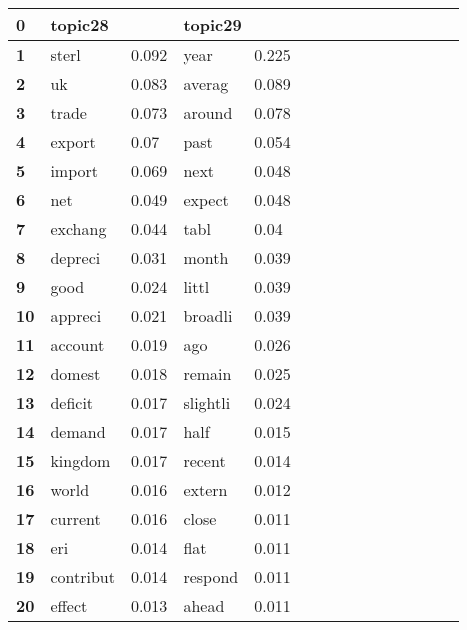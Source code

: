 \begin{tabular}{|l|l|l||l|l||l|l||l|l||l|l||l|l||l|l||}
\toprule
\textbf{0} & \multicolumn{2}{l}{topic28} & \multicolumn{2}{l}{topic29} \\
\midrule
\textbf{1 } &  sterl &  0.092 &  year &  0.225 \\
\textbf{2 } &  uk &  0.083 &  averag &  0.089 \\
\textbf{3 } &  trade &  0.073 &  around &  0.078 \\
\textbf{4 } &  export &  0.07 &  past &  0.054 \\
\textbf{5 } &  import &  0.069 &  next &  0.048 \\
\textbf{6 } &  net &  0.049 &  expect &  0.048 \\
\textbf{7 } &  exchang &  0.044 &  tabl &  0.04 \\
\textbf{8 } &  depreci &  0.031 &  month &  0.039 \\
\textbf{9 } &  good &  0.024 &  littl &  0.039 \\
\textbf{10} &  appreci &  0.021 &  broadli &  0.039 \\
\textbf{11} &  account &  0.019 &  ago &  0.026 \\
\textbf{12} &  domest &  0.018 &  remain &  0.025 \\
\textbf{13} &  deficit &  0.017 &  slightli &  0.024 \\
\textbf{14} &  demand &  0.017 &  half &  0.015 \\
\textbf{15} &  kingdom &  0.017 &  recent &  0.014 \\
\textbf{16} &  world &  0.016 &  extern &  0.012 \\
\textbf{17} &  current &  0.016 &  close &  0.011 \\
\textbf{18} &  eri &  0.014 &  flat &  0.011 \\
\textbf{19} &  contribut &  0.014 &  respond &  0.011 \\
\textbf{20} &  effect &  0.013 &  ahead &  0.011 \\
\bottomrule
\end{tabular}
